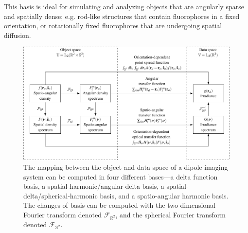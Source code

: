 \documentclass[]{osa-article}
\providecommand{\mbb}[1]{\mathbb{#1}}
\begin{document}
  This basis is ideal for simulating and analyzing objects that are angularly
  sparse and spatially dense; e.g. rod-like structures that contain fluorophores
  in a fixed orientation, or rotationally fixed fluorophores that are undergoing
  spatial diffusion.

  \begin{figure}
  \hspace{-5em}
  \includegraphics[scale=1.0]{../figures/dipole-block/dipole-block.pdf}
  \caption{The mapping between the object and data space of a dipole imaging
    system can be computed in four different bases---a delta function basis, a
    spatial-harmonic/angular-delta basis, a spatial-delta/spherical-harmonic
    basis, and a spatio-angular harmonic basis. The changes of basis can be
    computed with the two-dimensional Fourier transform denoted
    $\mathcal{F}_{\mbb{R}^2}$, and the spherical Fourier transform denoted
    $\mathcal{F}_{\mbb{S}^2}$.}
   \label{fig:dipole-block}      
    \end{figure}
\end{document}
